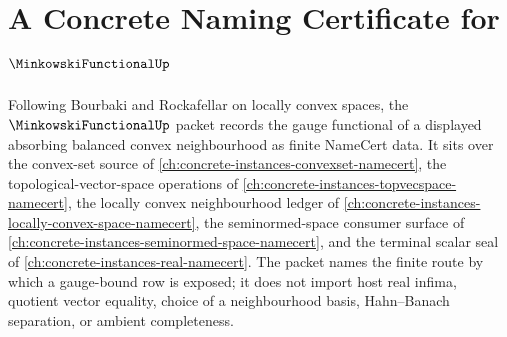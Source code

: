 \chapter{A Concrete Naming Certificate for $\MinkowskiFunctionalUp$}
\label{ch:concrete-instances-minkowski-functional-namecert}

Following Bourbaki and Rockafellar on locally convex spaces, the $\MinkowskiFunctionalUp$ packet records the gauge functional of a displayed absorbing balanced convex neighbourhood as finite NameCert data. It sits over the convex-set source of \autoref{ch:concrete-instances-convexset-namecert}, the topological-vector-space operations of \autoref{ch:concrete-instances-topvecspace-namecert}, the locally convex neighbourhood ledger of \autoref{ch:concrete-instances-locally-convex-space-namecert}, the seminormed-space consumer surface of \autoref{ch:concrete-instances-seminormed-space-namecert}, and the terminal scalar seal of \autoref{ch:concrete-instances-real-namecert}. The packet names the finite route by which a gauge-bound row is exposed; it does not import host real infima, quotient vector equality, choice of a neighbourhood basis, Hahn--Banach separation, or ambient completeness.

